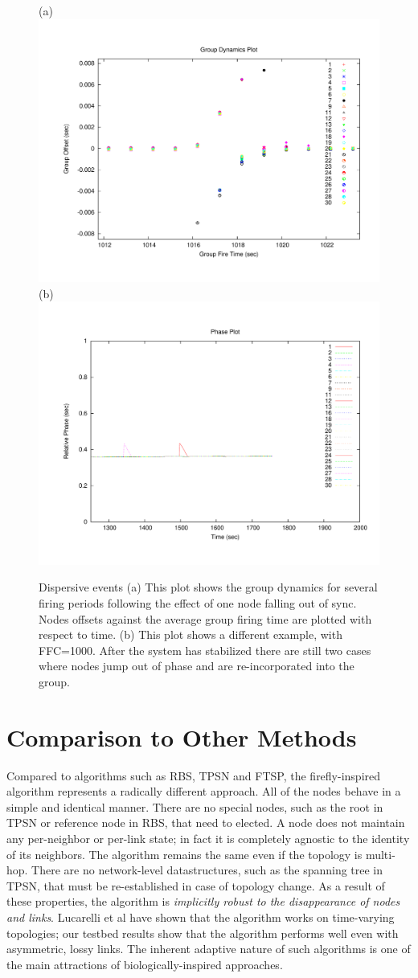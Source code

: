 \documentclass{sig-alternate}
\begin{document}
{\begin{figure}[t]
\begin{center}
(a)
\includegraphics[width=0.4\hsize]{./figures/GROUPDYNAMICS-SPECIFIC.pdf}
(b)
\includegraphics[width=0.4\hsize]{./figures/PHASEPLOT-SPECIFIC.pdf}
\end{center}
\caption{Dispersive events (a) This plot shows the group dynamics for
several firing periods following the effect of one node falling out of
sync. Nodes offsets against the average group firing time are plotted
with respect to time. (b) This plot shows a different example, with
FFC=1000. After the system has stabilized there are still two cases
where nodes jump out of phase and are re-incorporated into the group.}
\label{phaseplot-motelab-specific}
\end{figure}


\section{Comparison to Other Methods}

Compared to algorithms such as RBS, TPSN and FTSP\cite{rbs,ftsp,tpsn},
the firefly-inspired algorithm represents a radically different
approach. All of the nodes behave in a simple and identical
manner. There are no special nodes, such as the root in TPSN or
reference node in RBS, that need to elected. A node does not maintain
any per-neighbor or per-link state; in fact it is completely agnostic
to the identity of its neighbors. The algorithm remains the same even
if the topology is multi-hop. There are no network-level
datastructures, such as the spanning tree in TPSN, that must be
re-established in case of topology change. As a result of these
properties, the algorithm is {\em implicitly robust to the
disappearance of nodes and links}. Lucarelli et al \cite{lucarelli04}
have shown that the algorithm works on time-varying topologies; our
testbed results show that the algorithm performs well even with
asymmetric, lossy links. The inherent adaptive nature of such
algorithms is one of the main attractions of biologically-inspired
approaches.

}
\end{document}
